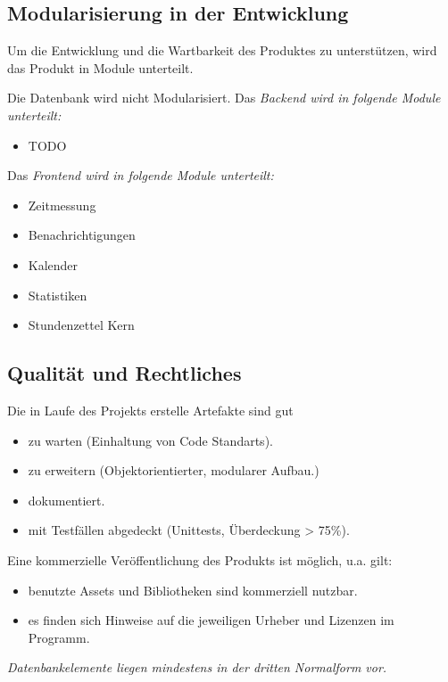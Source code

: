 \subsection{Modularisierung in der Entwicklung}

\begin{requirements}
     Um die Entwicklung und die Wartbarkeit des Produktes zu unterstützen, wird das Produkt in Module unterteilt.
    \begin{requirements}
         Die Datenbank wird nicht Modularisiert.
         Das \em{Backend} wird in folgende Module unterteilt:
            \begin{itemize}
                \item TODO
            \end{itemize}
         Das \em{Frontend} wird in folgende Module unterteilt:
            \begin{itemize}
                \item Zeitmessung
                \item Benachrichtigungen
                \item Kalender
                \item Statistiken
                \item Stundenzettel Kern
            \end{itemize}
    \end{requirements}
\end{requirements}

\subsection{Qualität und Rechtliches}
\begin{requirements}
     Die in Laufe des Projekts erstelle Artefakte sind gut
    \begin{itemize}
        \item zu warten (Einhaltung von Code Standarts).
        \item zu erweitern (Objektorientierter, modularer Aufbau.)
        \item dokumentiert.
        \item mit Testfällen abgedeckt (Unittests, Überdeckung > 75\%).
    \end{itemize}
     Eine kommerzielle Veröffentlichung des Produkts ist möglich, u.a. gilt:
    \begin{itemize}
        \item benutzte Assets und Bibliotheken sind kommerziell nutzbar.
    	\item es finden sich Hinweise auf die jeweiligen Urheber und Lizenzen im Programm.
    \end{itemize}
     \em{Datenbankelemente} liegen mindestens in der dritten Normalform vor.
\end{requirements}
